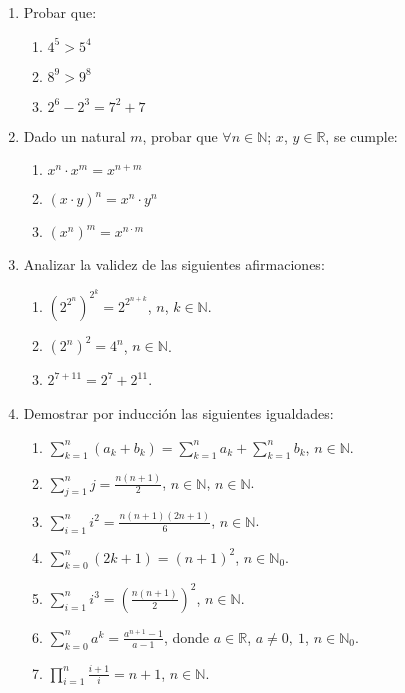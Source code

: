 \documentclass[12pt,spanish,makeidx]{amsbook}
\begin{document}
\begin{enumerate}
\smallskip

\item Probar que:
\begin{multicols}{3}
 \begin{enumerate}
\item \quad $4^5>5^4$
\item \quad $8^9>9^8$
\item \quad $2^6 - 2^3  = 7^2 + 7$
\end{enumerate}
\end{multicols}





\item Dado un natural $m$, probar que $\forall n \in {\mathbb N} $; $x$, $y \in {\mathbb R}$, se cumple:
\begin{multicols}{3}
 \begin{enumerate}
  \item $x^n \cdot x^m = x^{n+m}$
\item $(x\cdot y)^n=x^n\cdot y^n$
\item $(x^n)^m = x^{n\cdot m}$
 \end{enumerate}
\end{multicols}



\smallskip

\item Analizar la validez de las siguientes afirmaciones:
 \begin{enumerate}
\item  $(2^{2^n})^{2^k} = 2^{2^{n+k}}$,  $n$, $k \in {\mathbb N}$.
\item $(2^n)^2 = 4^n$, $n \in {\mathbb N}$.
\item $2^{7+11} = 2^7 + 2^{11}$.
\end{enumerate}

\smallskip


\item Demostrar por inducci\'on  las siguientes igualdades:
  \begin{enumerate}
  \item  $\displaystyle{ \sum_{k=1}^n (a_k + b_k) = \sum_{k=1}^n a_k + \sum_{k=1}^n b_k}$, $n\in \mathbb N$.
  \item  $\displaystyle{ \sum_{j=1}^n j = \frac{n(n+1)}{2}}$, $n\in \mathbb N$, $n\in \mathbb N$.
  \item  $\displaystyle{ \sum_{i=1}^n i^2 = \frac{n(n+1)(2n+1)}{6}}$, $n\in \mathbb N$.
  \item  $\displaystyle{ \sum_{k=0}^n (2k+1) = (n+1)^2}$, $n\in \mathbb N_0$.
  \item  $\displaystyle{ \sum_{i=1}^n i^3 = \left( \frac{n(n+1)}{2 }\right)^2}$, $n\in \mathbb N$.
  \item  $\displaystyle{ \sum_{k=0}^n a^k = \frac{a^{n+1}-1}{a-1}}$, donde $a\in {\mathbb R}$, $a \neq 0,\ 1$, $n\in \mathbb N_0$.
  \item  $\displaystyle{ \prod_{i=1}^n \frac{i+1}{i} = n+1}$, $n\in \mathbb N$.


\end{enumerate}
\end{enumerate}
\end{document}
